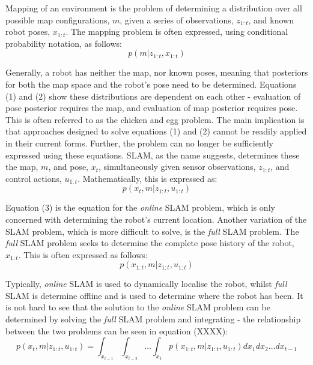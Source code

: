 \documentclass[a4paper]{article}
\begin{document}
Mapping of an environment is the problem of determining a distribution over all possible map configurations, $m$, given a series of observations, $z_{1:t}$, and known robot poses, $x_{1:t}$. The mapping problem is often expressed, using conditional probability notation, as follows:
\begin{equation}
p(m | z_{1:t}, x_{1:t})
\end{equation}

Generally, a robot has neither the map, nor known poses, meaning that posteriors for both the map space and the robot's pose need to be determined. Equations (1) and (2) show these distributions are dependent on each other - evaluation of pose posterior requires the map, and evaluation of map posterior requires pose. This is often referred to as the chicken and egg problem. The main implication is that approaches designed to solve equations (1) and (2) cannot be readily applied in their current forms. Further, the problem can no longer be sufficiently expressed using these equations. SLAM, as the name suggests, determines these the map, $m$, and pose, $x_t$, simultaneously given sensor observations, $z_{1:t}$, and control actions, $u_{1:t}$. Mathematically, this is expressed as:
\begin{equation}
p(x_t, m | z_{1:t}, u_{1:t})
\end{equation}

Equation (3) is the equation for the \textit{online} SLAM problem, which is only concerned with determining the robot's current location. Another variation of the SLAM problem, which is more difficult to solve, is the \textit{full} SLAM problem. The \textit{full} SLAM problem seeks to determine the complete pose history of the robot, $x_{1:t}$. This is often expressed as follows:
\begin{equation}
p(x_{1:t}, m | z_{1:t}, u_{1:t})
\end{equation}

Typically, \textit{online} SLAM is used to dynamically localise the robot, whilst \textit{full} SLAM is determine offline and is used to determine where the robot has been. It is not hard to see that the solution to the \textit{online} SLAM problem can be determined by solving the \textit{full} SLAM problem and integrating - the relationship between the two problems can be seen in equation (XXXX):
\begin{equation}
p(x_t, m | z_{1:t}, u_{1:t}) = \int_{x_{t-1}} \int_{x_{t-2}} \dots \int_{x_1} p(x_{1:t}, m | z_{1:t}, u_{1:t}) dx_1 dx_2 \dots dx_{t-1}
\end{equation}
\end{document}

